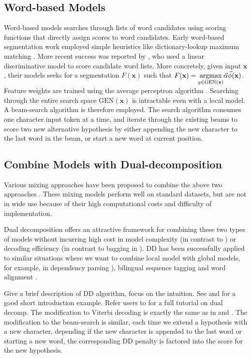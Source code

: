 \subsection{Word-based Models}
Word-based models searches through lists of word candidates using scoring functions that directly assign scores to word candidates. 
Early word-based segmentation work employed simple heuristics like dictionary-lookup maximum matching \cite{Chen:1992:ACL}. More recent success was reported by  , who used a linear discriminative model to score candidate word lists. 
More concretely, given input $\mathbf{x}$, their models seeks for a segmentation $F(\mathbf{x})$ such that $F(\mathbf{x}) =  \underset{y \in \mathrm{GEN}(\mathbf{x})}{\operatorname{argmax}}{ \vec\alpha \vec\phi(\mathbf{x}) }$.
Feature weights are trained using the average perceptron algorithm \cite{Collins:2002:EMNLP}. Searching through the entire  search space $\mathrm{GEN}(\mathbf{x})$ is intractable even with a local model. A beam-search algorithm is therefore employed. The search algorithm consumes one character input token at a time, and iterate through the existing beams to score two new alternative hypothesis by either appending the new character to the last word in the beam, or start a new word at current position.


\subsection{Combine Models with Dual-decomposition} 
Various mixing approaches have been proposed to combine the above two approaches \cite{Wang:2006:SIGHAN,Lin:2009:CICLing,Sun:2009:HLT-NAACL,Sun:2010:COLING,Wang:2010:COLING}. 
These mixing models perform well on standard datasets, but are not in wide use because of their high computational costs and difficulty of implementation.

Dual decomposition offers an attractive framework for combining these two types of models without incurring high cost in model complexity (in contrast to \cite{Sun:2009:HLT-NAACL}) or decoding efficiency (in contrast to bagging in \cite{Wang:2006:SIGHAN,Sun:2010:COLING}).
DD has been successfully applied to similar situations where we want to combine local model with global models, for example, in dependency parsing \cite{Koo:2010:EMNLP}), bilingual sequence tagging \cite{Wang:2013:ACL} and word alignment \cite{Denero:2011:ACL}.  

Give a brief description of DD algorithm, focus on the intuition. See \cite{Wang:2013:ACL} and \cite{Denero:2011:ACL} for a good short introduction example.
Refer users to \cite{Rush:2012:JAIR} for a full tutorial on dual decomp.
The modification to Viterbi decoding is exactly the same as in \cite{Wang:2013:ACL} and \cite{Denero:2011:ACL}. The modification to the beam-search is similar, each time we extend a hypothesis with a new character, depending if the new character is appended to the last word or starting a new word, the corresponding DD penalty is factored into the score for the new hypothesis. 